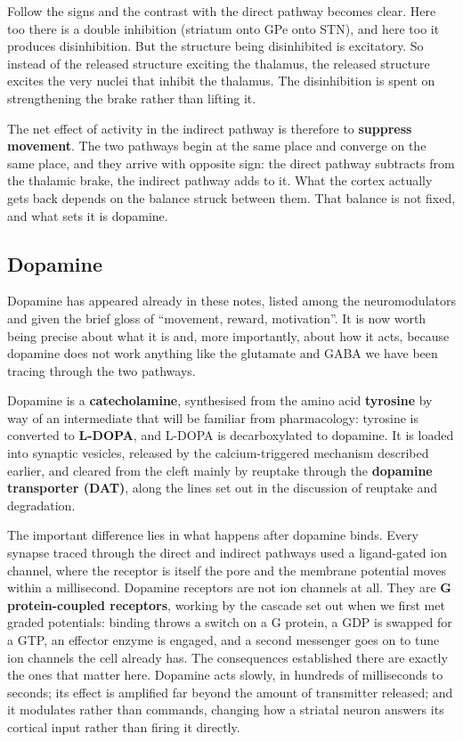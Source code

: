 \documentclass[11pt]{article}
\begin{document}
Follow the signs and the contrast with the direct pathway becomes clear. Here too there is a double inhibition (striatum onto GPe onto STN), and here too it produces disinhibition. But the structure being disinhibited is excitatory. So instead of the released structure exciting the thalamus, the released structure excites the very nuclei that inhibit the thalamus. The disinhibition is spent on strengthening the brake rather than lifting it.

The net effect of activity in the indirect pathway is therefore to \textbf{suppress movement}. The two pathways begin at the same place and converge on the same place, and they arrive with opposite sign: the direct pathway subtracts from the thalamic brake, the indirect pathway adds to it. What the cortex actually gets back depends on the balance struck between them. That balance is not fixed, and what sets it is dopamine.

\subsection{Dopamine}

Dopamine has appeared already in these notes, listed among the neuromodulators and given the brief gloss of ``movement, reward, motivation''. It is now worth being precise about what it is and, more importantly, about how it acts, because dopamine does not work anything like the glutamate and GABA we have been tracing through the two pathways.

Dopamine is a \textbf{catecholamine}, synthesised from the amino acid \textbf{tyrosine} by way of an intermediate that will be familiar from pharmacology: tyrosine is converted to \textbf{L-DOPA}, and L-DOPA is decarboxylated to dopamine. It is loaded into synaptic vesicles, released by the calcium-triggered mechanism described earlier, and cleared from the cleft mainly by reuptake through the \textbf{dopamine transporter (DAT)}, along the lines set out in the discussion of reuptake and degradation.

The important difference lies in what happens after dopamine binds. Every synapse traced through the direct and indirect pathways used a ligand-gated ion channel, where the receptor is itself the pore and the membrane potential moves within a millisecond. Dopamine receptors are not ion channels at all. They are \textbf{G protein-coupled receptors}, working by the cascade set out when we first met graded potentials: binding throws a switch on a G protein, a GDP is swapped for a GTP, an effector enzyme is engaged, and a second messenger goes on to tune ion channels the cell already has. The consequences established there are exactly the ones that matter here. Dopamine acts slowly, in hundreds of milliseconds to seconds; its effect is amplified far beyond the amount of transmitter released; and it modulates rather than commands, changing how a striatal neuron answers its cortical input rather than firing it directly.
\end{document}
